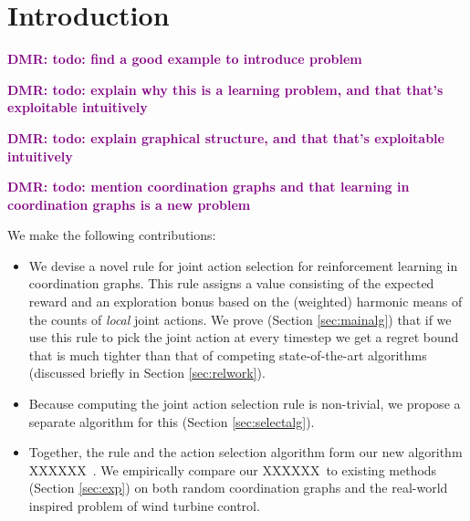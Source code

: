 \documentclass{article}
\newcommand{\algname}{XXXXXX\ }
\newcommand{\dmr}[1]{\textcolor{purple}{\bf DMR: #1}}
\begin{document}
 


\begin{abstract} 
\dmr{TODO}
\end{abstract} 

\section{Introduction}
\label{sec:intro}
\dmr{todo: find a good example to introduce problem}

\dmr{todo: explain why this is a learning problem, and that that's exploitable intuitively}

\dmr{todo: explain graphical structure, and that that's exploitable intuitively}

\dmr{todo: mention coordination graphs and that learning in coordination graphs is a new problem}

We make the following contributions:
\begin{itemize}
\item We devise a novel rule for joint action selection for reinforcement learning in coordination graphs. This rule assigns a value consisting of the expected reward and an exploration bonus based on the (weighted) harmonic means of the counts of \emph{local} joint actions. We prove (Section \ref{sec:mainalg}) that if we use this rule to pick the joint action at every timestep we get a regret bound that is much tighter than that of competing state-of-the-art algorithms (discussed briefly in Section \ref{sec:relwork}). 
\item Because computing the joint action selection rule is non-trivial, we propose a separate algorithm for this (Section \ref{sec:selectalg}).
\item Together, the rule and the action selection algorithm form our new algorithm \algname\!. We empirically compare our \algname to existing methods (Section \ref{sec:exp}) on both random coordination graphs and the real-world inspired problem of wind turbine control. 
\end{itemize}
\end{document}
